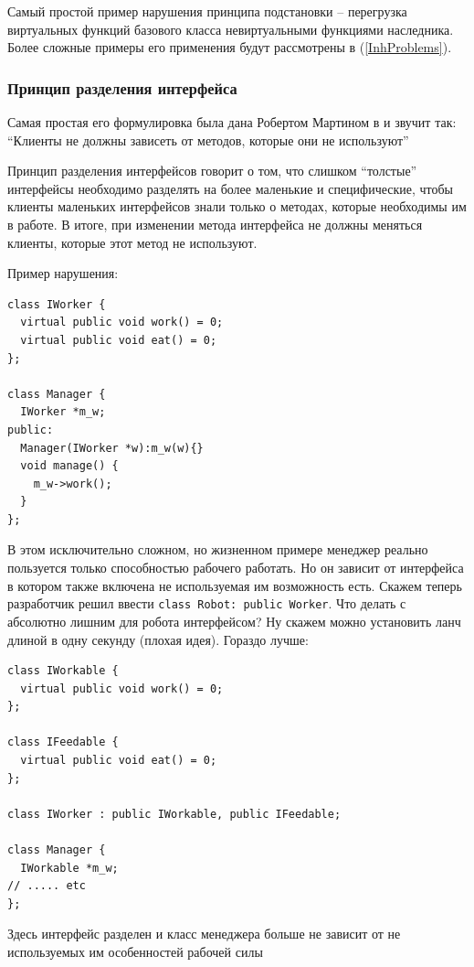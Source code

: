 \documentclass[a4paper,12pt,oneside]{article}
\begin{document}
Самый простой пример нарушения принципа подстановки -- перегрузка виртуальных функций базового класса невиртуальными функциями наследника. Более сложные примеры его применения будут рассмотрены в (\ref{InhProblems}).

\subsubsection{Принцип разделения интерфейса}\label{ISP}

Самая простая его формулировка была дана Робертом Мартином в \cite{ISP} и звучит так: ``Клиенты не должны зависеть от методов, которые они не используют''

Принцип разделения интерфейсов говорит о том, что слишком ``толстые'' интерфейсы необходимо разделять на более маленькие и специфические, чтобы клиенты маленьких интерфейсов знали только о методах, которые необходимы им в работе. В итоге, при изменении метода интерфейса не должны меняться клиенты, которые этот метод не используют.

Пример нарушения:

\begin{lstlisting}
class IWorker {
  virtual public void work() = 0;
  virtual public void eat() = 0;
};

class Manager {
  IWorker *m_w;
public:
  Manager(IWorker *w):m_w(w){}
  void manage() {
    m_w->work();
  }
};
\end{lstlisting}

В этом исключительно сложном, но жизненном примере менеджер реально пользуется только способностью рабочего работать. Но он зависит от интерфейса в котором также включена не используемая им возможность есть. Скажем теперь разработчик решил ввести \lstinline!class Robot: public Worker!. Что делать с абсолютно лишним для робота интерфейсом? Ну скажем можно установить ланч длиной в одну секунду (плохая идея). Гораздо лучше:

\begin{lstlisting}
class IWorkable {
  virtual public void work() = 0;
};

class IFeedable {
  virtual public void eat() = 0;
};

class IWorker : public IWorkable, public IFeedable;

class Manager {
  IWorkable *m_w;
// ..... etc
};
\end{lstlisting}

Здесь интерфейс разделен и класс менеджера больше не зависит от не используемых им особенностей рабочей силы
\end{document}
